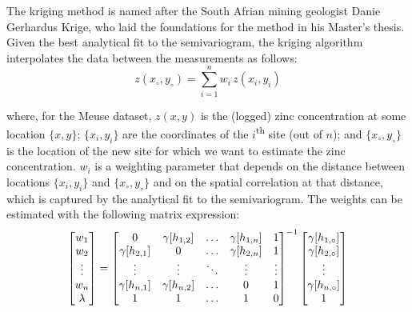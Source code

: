 The kriging method is named after the South Afrian mining geologist
Danie Gerhardus Krige, who laid the foundations for the method in his
Master's thesis.  Given the best analytical fit to the semivariogram,
the kriging algorithm interpolates the data between the measurements
as follows:
\begin{equation}
z(x_\circ,y_\circ) = \sum\limits_{i=1}^n w_i \, z(x_i,y_i)
\label{eq:kriging}
\end{equation}

\noindent where, for the Meuse dataset, $z(x,y)$ is the (logged) zinc
concentration at some location $\{x,y\}$; $\{x_i,y_i\}$ are the
coordinates of the $i$\textsuperscript{th} site (out of $n$); and
$\{x_\circ,y_\circ\}$ is the location of the new site for which we
want to estimate the zinc concentration. $w_i$ is a weighting
parameter that depends on the distance between locations $\{x_i,y_i\}$
and $\{x_\circ,y_\circ\}$ and on the spatial correlation at that
distance, which is captured by the analytical fit to the
semivariogram. The weights can be estimated with the following matrix
expression:
\begin{equation}
  \left[
    \begin{array}{@{}c@{}}
      w_1 \\
      w_2 \\
      \vdots \\
      w_n \\
      \lambda
    \end{array}
    \right]
  =
  \left[
    \begin{array}{@{}ccccc@{}}
      0 & \gamma[h_{1,2}] & \ldots & \gamma[h_{1,n}] & 1 \\
      \gamma[h_{2,1}] & 0 & \ldots & \gamma[h_{2,n}] & 1 \\
      \vdots & \vdots & \ddots & \vdots & \vdots \\
      \gamma[h_{n,1}] & \gamma[h_{n,2}] & \ldots & 0 & 1 \\
      1 & 1 & \ldots & 1 & 0 \\
    \end{array}
    \right]^{-1}
  \left[
    \begin{array}{@{}c@{}}
      \gamma[h_{1,\circ}] \\
      \gamma[h_{2,\circ}] \\
      \vdots \\
      \gamma[h_{n,\circ}]\\
      1
    \end{array}
    \right]
\label{eq:krigingweights}
\end{equation}

